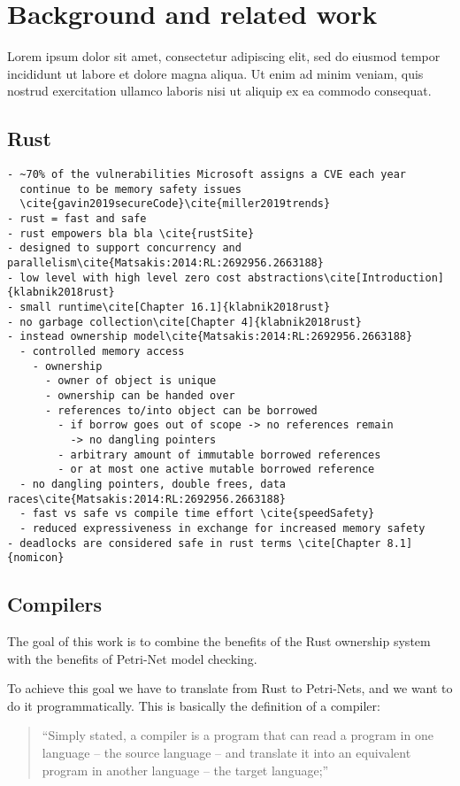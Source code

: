 \chapter{Background and related work}
Lorem ipsum dolor sit amet, consectetur adipiscing elit, sed do eiusmod tempor incididunt ut labore et dolore magna aliqua. Ut enim ad minim veniam, quis nostrud exercitation ullamco laboris nisi ut aliquip ex ea commodo consequat.\cite{klabnik2018rust}
\section{Rust}
\label{rel_rust}
\begin{verbatim}
- ~70% of the vulnerabilities Microsoft assigns a CVE each year 
  continue to be memory safety issues
  \cite{gavin2019secureCode}\cite{miller2019trends}
- rust = fast and safe
- rust empowers bla bla \cite{rustSite}
- designed to support concurrency and parallelism\cite{Matsakis:2014:RL:2692956.2663188}
- low level with high level zero cost abstractions\cite[Introduction]{klabnik2018rust}
- small runtime\cite[Chapter 16.1]{klabnik2018rust}
- no garbage collection\cite[Chapter 4]{klabnik2018rust}
- instead ownership model\cite{Matsakis:2014:RL:2692956.2663188}
  - controlled memory access
    - ownership
      - owner of object is unique
      - ownership can be handed over
      - references to/into object can be borrowed
        - if borrow goes out of scope -> no references remain
          -> no dangling pointers
        - arbitrary amount of immutable borrowed references
        - or at most one active mutable borrowed reference
  - no dangling pointers, double frees, data races\cite{Matsakis:2014:RL:2692956.2663188}
  - fast vs safe vs compile time effort \cite{speedSafety}
  - reduced expressiveness in exchange for increased memory safety
- deadlocks are considered safe in rust terms \cite[Chapter 8.1]{nomicon}
\end{verbatim}

\section{Compilers}
The goal of this work is to combine the benefits of the Rust ownership system with the benefits of Petri-Net model checking.

To achieve this goal we have to translate from Rust to Petri-Nets, 
and we want to do it programmatically.
This is basically the definition of a compiler\cite[Chapter 1.1]{aho1986compilers}:
\begin{quote}
``Simply stated, a compiler is a program that can read a program in one language -- the source language -- and translate it into an equivalent program in another language -- the target language;''
\end{quote}

